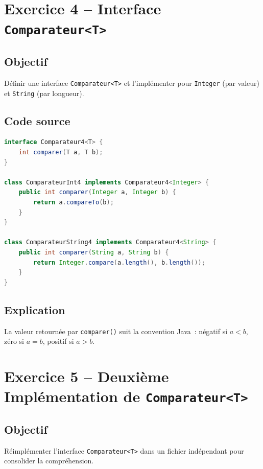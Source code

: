 \section{Exercice 4 -- Interface \texttt{Comparateur<T>}}

\subsection{Objectif}

Définir une interface \texttt{Comparateur<T>} et l'implémenter pour
\texttt{Integer} (par valeur) et \texttt{String} (par longueur).

\subsection{Code source}

\begin{lstlisting}[language=Java, caption={exo4\_3.java -- Interface Comparateur}]
interface Comparateur4<T> {
    int comparer(T a, T b);
}

class ComparateurInt4 implements Comparateur4<Integer> {
    public int comparer(Integer a, Integer b) {
        return a.compareTo(b);
    }
}

class ComparateurString4 implements Comparateur4<String> {
    public int comparer(String a, String b) {
        return Integer.compare(a.length(), b.length());
    }
}
\end{lstlisting}

\subsection{Explication}

La valeur retournée par \texttt{comparer()} suit la convention Java~:
négatif si $a < b$, zéro si $a = b$, positif si $a > b$.

\section{Exercice 5 -- Deuxième Implémentation de \texttt{Comparateur<T>}}

\subsection{Objectif}

Réimplémenter l'interface \texttt{Comparateur<T>} dans un fichier indépendant
pour consolider la compréhension.


